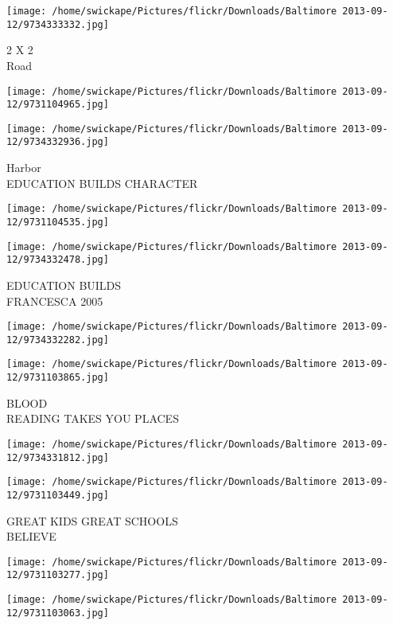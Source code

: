 \documentclass[10pt,letterpaper]{article}
\begin{document}
\vspace{0.25in}
\texttt{[image: /home/swickape/Pictures/flickr/Downloads/Baltimore 2013-09-12/9734333332.jpg]}

2 X 2\\
Road
\pagebreak

\texttt{[image: /home/swickape/Pictures/flickr/Downloads/Baltimore 2013-09-12/9731104965.jpg]}

\vspace{0.25in}
\texttt{[image: /home/swickape/Pictures/flickr/Downloads/Baltimore 2013-09-12/9734332936.jpg]}

Harbor\\
EDUCATION BUILDS CHARACTER
\pagebreak

\texttt{[image: /home/swickape/Pictures/flickr/Downloads/Baltimore 2013-09-12/9731104535.jpg]}

\vspace{0.25in}
\texttt{[image: /home/swickape/Pictures/flickr/Downloads/Baltimore 2013-09-12/9734332478.jpg]}

EDUCATION BUILDS\\
FRANCESCA 2005
\pagebreak

\texttt{[image: /home/swickape/Pictures/flickr/Downloads/Baltimore 2013-09-12/9734332282.jpg]}

\vspace{0.25in}
\texttt{[image: /home/swickape/Pictures/flickr/Downloads/Baltimore 2013-09-12/9731103865.jpg]}

BLOOD\\
READING TAKES YOU PLACES
\pagebreak

\texttt{[image: /home/swickape/Pictures/flickr/Downloads/Baltimore 2013-09-12/9734331812.jpg]}

\vspace{0.25in}
\texttt{[image: /home/swickape/Pictures/flickr/Downloads/Baltimore 2013-09-12/9731103449.jpg]}

GREAT KIDS GREAT SCHOOLS\\
BELIEVE
\pagebreak

\texttt{[image: /home/swickape/Pictures/flickr/Downloads/Baltimore 2013-09-12/9731103277.jpg]}

\vspace{0.25in}
\texttt{[image: /home/swickape/Pictures/flickr/Downloads/Baltimore 2013-09-12/9731103063.jpg]}
\end{document}
